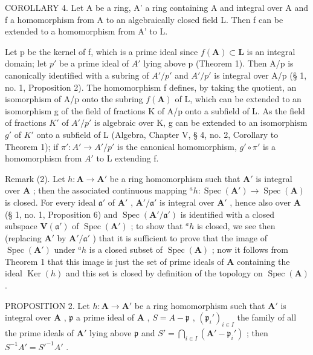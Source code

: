 COROLLARY 4. Let A be a ring, A' a ring containing A and integral over A and f a homomorphism from A to an algebraically closed field L. Then f can be extended to a homomorphism from A' to L.

Let p be the kernel of f, which is a prime ideal since \(f(\mathbf{A}) \subset \mathbf{L}\) is an integral domain; let \(p'\) be a prime ideal of \(A'\) lying above p (Theorem 1). Then A/p is canonically identified with a subring of \(A'/p'\) and \(A'/p'\) is integral over A/p (§ 1, no. 1, Proposition 2). The homomorphism f defines, by taking the quotient, an isomorphism of A/p onto the subring \(f(\mathbf{A})\) of L, which can be extended to an isomorphism g of the field of fractions K of A/p onto a subfield of L. As the field of fractions \(K'\) of \(A'/p'\) is algebraic over K, g can be extended to an isomorphism \(g'\) of \(K'\) onto a subfield of L (Algebra, Chapter V, § 4, no. 2, Corollary to Theorem 1); if \(\pi': A' \to A'/p'\) is the canonical homomorphism, \(g' \circ \pi'\) is a homomorphism from \(A'\) to L extending f.

Remark (2). Let \(h \colon \mathbf{A} \to \mathbf{A}'\) be a ring homomorphism such that \(\mathbf{A}'\) is integral over \(\mathbf{A}\) ; then the associated continuous mapping \(^a h \colon \operatorname{Spec}(\mathbf{A}') \to \operatorname{Spec}(\mathbf{A})\) is closed. For every ideal \(\mathfrak{a}'\) of \(\mathbf{A}'\) , \(\mathbf{A}' / \mathfrak{a}'\) is integral over \(\mathbf{A}'\) , hence also over \(\mathbf{A}\) (§ 1, no. 1, Proposition 6) and \(\operatorname{Spec}(\mathbf{A}' / \mathfrak{a}')\) is identified with a closed subspace \(\mathbf{V}(\mathfrak{a}')\) of \(\operatorname{Spec}(\mathbf{A}')\) ; to show that \(^a h\) is closed, we see then (replacing \(\mathbf{A}'\) by \(\mathbf{A}' / \mathfrak{a}'\) ) that it is sufficient to prove that the image of \(\operatorname{Spec}(\mathbf{A}')\) under \(^a h\) is a closed subset of \(\operatorname{Spec}(\mathbf{A})\) ; now it follows from Theorem 1 that this image is just the set of prime ideals of \(\mathbf{A}\) containing the ideal \(\operatorname{Ker}(h)\) and this set is closed by definition of the topology on \(\operatorname{Spec}(\mathbf{A})\) .

PROPOSITION 2. Let \(h: \mathbf{A} \to \mathbf{A}'\) be a ring homomorphism such that \(\mathbf{A}'\) is integral over \(\mathbf{A}\) , \(\mathfrak{p}\) a prime ideal of \(\mathbf{A}\) , \(S = A - \mathfrak{p}\) , \((\mathfrak{p}_i')_{i \in I}\) the family of all the prime ideals of \(\mathbf{A}'\) lying above \(\mathfrak{p}\) and \(S' = \bigcap_{i \in I} (\mathbf{A}' - \mathfrak{p}_i')\) ; then \(S^{-1}A' = S'^{-1}A'\) .

